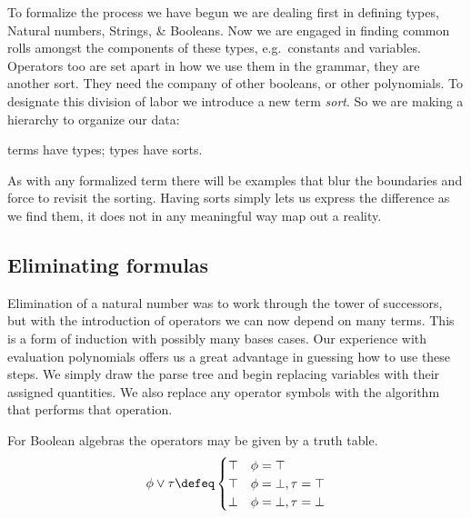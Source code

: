 To formalize the process we have begun we are dealing first in defining types, 
Natural numbers, Strings, \& Booleans.  Now we are engaged in finding common rolls 
amongst the components of these types, e.g.\ constants and variables.
Operators too are set apart in how we use them in the grammar, they are another sort.  They 
need the company of other booleans, or other polynomials.
To designate this division of labor we introduce a new term \emph{sort}.
So we are making a hierarchy to organize our data:
\begin{center}
    terms have types;
    types have sorts.
\end{center}
As with any formalized term there will be examples that blur the boundaries and force 
to revisit the sorting.  Having sorts simply lets us express the difference as we 
find them, it does not in any meaningful way map out a reality.

\subsection{Eliminating formulas}

Elimination of a natural number was to work through the tower of successors, 
but with the introduction of operators we can now depend on many terms.  This 
is a form of induction with possibly many bases cases.  Our experience with 
evaluation polynomials offers us a great advantage in guessing how to use these steps.
We simply draw the parse tree and begin replacing variables with their assigned
quantities.  We also replace any operator symbols with the algorithm that performs 
that operation.

For Boolean algebras the operators may be given by a truth table.
\begin{align*}
    \phi \vee \tau \defeq \begin{cases}
        \top & \phi=\top\\
        \top & \phi=\bot, \tau=\top\\
        \bot & \phi=\bot, \tau=\bot
    \end{cases}
\end{align*}
